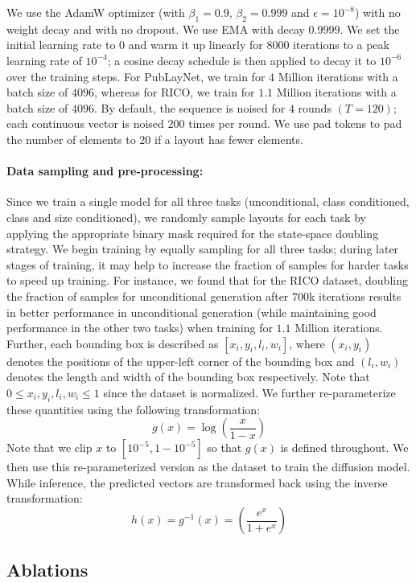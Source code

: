 We use the AdamW optimizer \cite{loshchilov2018decoupled} (with $\beta_1 = 0.9$, $\beta_2 = 0.999$ and $\epsilon = 10^{-8}$) with no weight decay and with no dropout.  We use EMA with decay $0.9999$.  We set the initial learning rate to 0 and warm it up linearly for 8000 iterations to a peak learning rate of $10^{-4}$; a cosine decay schedule is then applied to decay it to $10^{-6}$ over the training steps. For PubLayNet, we train for $4$ Million iterations with a batch size of $4096$, whereas for RICO, we train for $1.1$ Million iterations with a batch size of $4096$. By default, the sequence is noised for $4$ rounds $(T = 120)$; each continuous vector is noised $200$ times per round. We use pad tokens to pad the number of elements to 20 if a layout has fewer elements.

\paragraph{Data sampling and pre-processing:}
Since we train a single model for all three tasks (unconditional, class conditioned, class and size conditioned), we randomly sample layouts for each task by applying the appropriate binary mask required for the state-space doubling strategy. We begin training by equally sampling for all three tasks; during later stages of training, it may help to increase the fraction of samples for harder tasks to speed up training. For instance, we found that for the RICO dataset, doubling the fraction of samples for unconditional generation after $700$k iterations results in better performance in unconditional generation (while maintaining good performance in the other two tasks) when training for $1.1$ Million iterations. Further, each bounding box is described as $[x_i, y_i, l_i, w_i]$, where $(x_i, y_i)$ denotes the positions of the upper-left corner of the bounding box and $(l_i, w_i)$ denotes the length and width of the bounding box respectively. Note that $0 \leq x_i,y_i,l_i,w_i \leq 1 $ since the dataset is normalized. We further re-parameterize these quantities using the following transformation:
$$ g(x) = \log\left(\frac{x}{1-x} \right) $$
Note that we clip $x$ to $[10^{-5}, 1-10^{-5}]$ so that $g(x)$ is defined throughout. We then use this re-parameterized version as the dataset to train the diffusion model. While inference, the predicted vectors are transformed back using the inverse transformation:
$$ h(x) = g^{-1}(x) = \left(\frac{e^{x}}{1+e^{x}} \right) $$

\subsection{Ablations}
\label{app:subsec:abl_layout}

